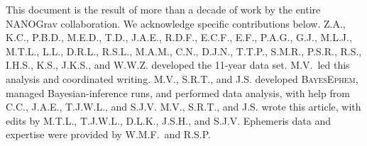 This document is the result of more than a decade of work by the entire NANOGrav collaboration.
We acknowledge specific contributions below.
Z.A., K.C., P.B.D., M.E.D., T.D., J.A.E., R.D.F., E.C.F., E.F., P.A.G., G.J., M.L.J., M.T.L., L.L., D.R.L., R.S.L., M.A.M., C.N., D.J.N., T.T.P., S.M.R., P.S.R., R.S., I.H.S., K.S., J.K.S., and W.W.Z. developed the 11-year data set.
M.V.\ led this analysis and coordinated writing.
M.V., S.R.T., and J.S. developed \textsc{BayesEphem}, managed Bayesian-inference runs, and performed data analysis, with help from C.C., J.A.E., T.J.W.L., and S.J.V.
M.V., S.R.T., and J.S. wrote this article, with edits by M.T.L., T.J.W.L., D.L.K., J.S.H., and S.J.V.
Ephemeris data and expertise were provided by W.M.F.\ and R.S.P.
